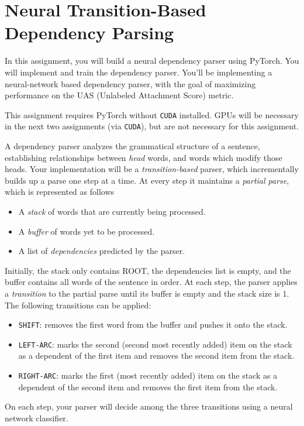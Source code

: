 \section{Neural Transition-Based Dependency Parsing}
In this assignment, you will build a neural dependency parser using PyTorch. You will implement and train the dependency parser.
You'll be implementing a neural-network based dependency parser, with the goal of maximizing performance on the UAS (Unlabeled Attachment Score) metric.\newline

This assignment requires PyTorch without \texttt{CUDA} installed.  GPUs will be necessary in the next two assignments (via \texttt{CUDA}), but are not necessary for this assignment.\newline

A dependency parser analyzes the grammatical structure of a sentence, establishing relationships between \textit{head} words, and words which modify those heads. Your implementation will be a {\it transition-based} parser, which incrementally builds up a parse one step at a time. At every step it maintains a \textit{partial parse}, which is represented as follows
\begin{itemize}
    \item A \textit{stack} of words that are currently being processed.
    \item A \textit{buffer} of words yet to be processed.
    \item A list of \textit{dependencies} predicted by the parser.
\end{itemize}
Initially, the stack only contains ROOT, the dependencies list is empty, and the buffer contains all words of the sentence in order. At each step, the parser applies a \textit{transition} to the partial parse until its buffer is empty and the stack size is 1. The following transitions can be applied:
\begin{itemize}
\item \texttt{SHIFT}: removes the first word from the buffer and pushes it onto the stack.
\item \texttt{LEFT-ARC}: marks the second (second most recently added) item on the stack as a dependent of the first item and removes the second item from the stack.
\item \texttt{RIGHT-ARC}: marks the first (most recently added) item on the stack as a dependent of the second item and removes the first item from the stack.
\end{itemize}
On each step, your parser will decide among the three transitions using a neural network classifier.


